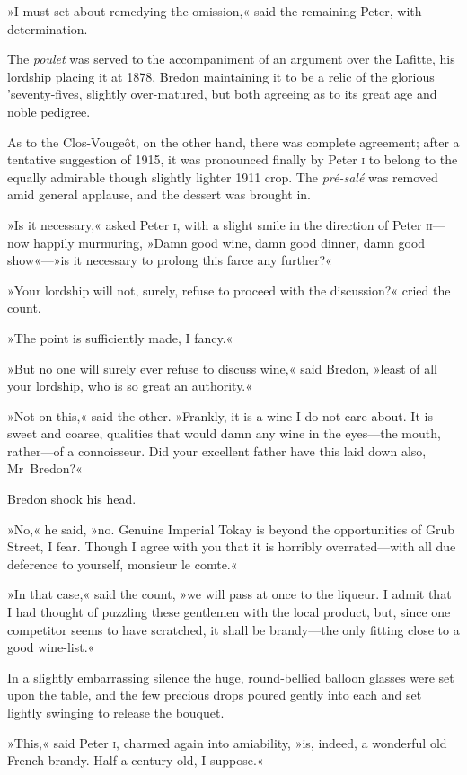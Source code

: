 »I must set about remedying the omission,« said the remaining Peter, with determination.

The \textit{poulet} was served to the accompaniment of an argument over the Lafitte, his lordship placing it at 1878, Bredon maintaining it to be a relic of the glorious 'seventy-fives, slightly over-matured, but both agreeing as to its great age and noble pedigree.

As to the Clos-Vougeôt, on the other hand, there was complete agreement; after a tentative suggestion of 1915, it was pronounced finally by Peter \textsc{i} to belong to the equally admirable though slightly lighter 1911 crop. The \textit{pré-salé} was removed amid general applause, and the dessert was brought in.

»Is it necessary,« asked Peter \textsc{i}, with a slight smile in the direction of Peter \textsc{ii}—now happily murmuring, »Damn good wine, damn good dinner, damn good show«—»is it necessary to prolong this farce any further?«

»Your lordship will not, surely, refuse to proceed with the discussion?« cried the count.

»The point is sufficiently made, I fancy.«

»But no one will surely ever refuse to discuss wine,« said Bredon, »least of all your lordship, who is so great an authority.«

»Not on this,« said the other. »Frankly, it is a wine I do not care about. It is sweet and coarse, qualities that would damn any wine in the eyes—the mouth, rather—of a connoisseur. Did your excellent father have this laid down also, Mr~Bredon?«

Bredon shook his head.

»No,« he said, »no. Genuine Imperial Tokay is beyond the opportunities of Grub Street, I fear. Though I agree with you that it is horribly overrated—with all due deference to yourself, monsieur le comte.«

»In that case,« said the count, »we will pass at once to the liqueur. I admit that I had thought of puzzling these gentlemen with the local product, but, since one competitor seems to have scratched, it shall be brandy—the only fitting close to a good wine-list.«

In a slightly embarrassing silence the huge, round-bellied balloon glasses were set upon the table, and the few precious drops poured gently into each and set lightly swinging to release the bouquet.

»This,« said Peter \textsc{i}, charmed again into amiability, »is, indeed, a wonderful old French brandy. Half a century old, I suppose.«


